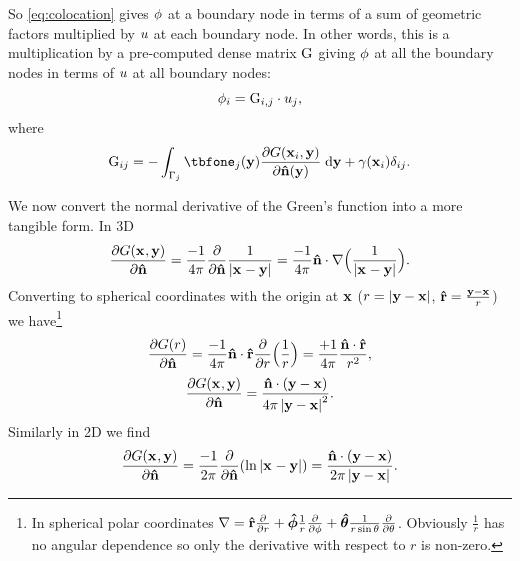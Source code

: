 So \cref{eq:colocation} gives $\phi$ at a boundary node in terms of a sum of geometric factors multiplied by $u$ at each boundary node.
In other words, this is a multiplication by a pre-computed dense matrix ${\mathbf{\mathrm{G}}}$ giving $\phi$ at all the boundary nodes in terms of $u$ at all boundary nodes:
\begin{equation}
  \label{eq:10}
  \phim_\ibasis = \bm_{\ibasis,\ibasisb} \cdot \phione_{\ibasisb},
\end{equation}
where
\begin{equation}
  \label{eq:17}
  \bm_{\ibasis\ibasisb} = - \int_{\boundd_\ibasisb} \tbfone_{\ibasisb}(\yv) \pd{\Green[\ibasis]}{\nv(\yv)} \d \yv
   + \gamma(\xv_\ibasis)\delta_{\ibasis\ibasisb}.
\end{equation}



We now convert the normal derivative of the Green's function into a more tangible form.
In 3D
\begin{equation}
  \label{eq:11}
  \pd{\Green}{\nv} = \frac{-1}{4 \pi} \pd{}{\nv} \Gthreed = \frac{-1}{4 \pi} \nv \cdot \grad \Big( \Gthreed \Big).
\end{equation}
Converting to spherical coordinates with the origin at $\boldsymbol{\mathrm{x}}$ ($r = \left|{\boldsymbol{\mathrm{y}} - \boldsymbol{\mathrm{x}}} \right|$, $\boldsymbol{\mathrm{\hat{r}}} = \frac{\boldsymbol{\mathrm{y}} - \boldsymbol{\mathrm{x}}}{r}$) we have\footnote{In spherical polar coordinates $\nabla = \boldsymbol{\mathrm{\hat{r}}} \frac{\partial }{\partial r} +  \boldsymbol{\mathrm{\hat{\phi}}} \frac{1}{r} \frac{\partial }{\partial \phi} + \boldsymbol{\mathrm{\hat{\theta}}} \frac{1}{r \sin \theta} \frac{\partial }{\partial \theta}$.
Obviously $\frac{1}{r}$ has no angular dependence so only the derivative with respect to $r$ is non-zero.}
\begin{equation}
  \label{eq:12}
  \pd{G(r)}{\nv} = \frac{-1}{4 \pi} \nv \cdot \ruv \pd{}{r} \Big( \frac{1}{r} \Big)
  = \frac{+1}{4 \pi}  \frac{\nv \cdot \ruv}{r^2},
\end{equation}
\begin{equation}
  \label{eq:13}
  \pd{\Green}{\nv} = \frac{\nv \cdot (\yv - \xv)}{4 \pi \abs{\yv - \xv} ^2} .
\end{equation}
Similarly in 2D we find
\begin{equation}
  \label{eq:14}
  \pd{\Green}{\nv} = \frac{-1}{2 \pi} \pd{}{\nv} (\Gtwod) = \frac{\nv \cdot (\yv - \xv)}{2 \pi \abs{\yv - \xv}}.
\end{equation}

